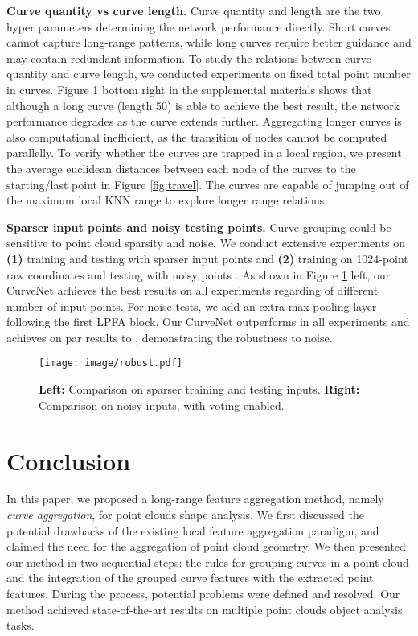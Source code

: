 \documentclass[10pt,twocolumn,letterpaper]{article}
\theoremstyle{definition}
\begin{document}
\noindent
\textbf{Curve quantity vs curve length.} Curve quantity  and length  are the two hyper parameters determining the network performance directly. Short curves cannot capture long-range patterns, while long curves require better guidance and may contain redundant information. To study the relations between curve quantity and curve length, we conducted experiments on fixed total point number in curves. Figure 1 bottom right in the supplemental materials shows that although a long curve (length 50) is able to achieve the best result, the network performance degrades as the curve extends further. Aggregating longer curves is also computational inefficient, as the transition of nodes cannot be computed parallelly. To verify whether the curves are trapped in a local region, we present the average euclidean distances between each node of the curves to the starting/last point in Figure \ref{fig:travel}. The curves are capable of jumping out of the maximum local KNN range to explore longer range relations.

\noindent
\textbf{Sparser input points and noisy testing points.} Curve grouping could be sensitive to point cloud sparsity and noise. We conduct extensive experiments on \textbf{(1)} training and testing with sparser input points and \textbf{(2)} training on 1024-point raw coordinates and testing with noisy points \cite{yan2020pointasnl}. As shown in Figure \ref{fig:robust} left, our CurveNet achieves the best results on all experiments regarding of different number of input points. For noise tests, we add an extra max pooling layer following the first LPFA block. Our CurveNet outperforms \cite{shen2018mining, qi2017pointnet} in all experiments and achieves on par results to \cite{yan2020pointasnl}, demonstrating the robustness to noise.




\begin{figure}[t]
	\begin{center}
\texttt{[image: image/robust.pdf]}
	\end{center}
	\caption{\textbf{Left:} Comparison on sparser training and testing inputs. \textbf{Right:} Comparison on noisy inputs, with voting enabled.}
	\label{fig:robust}
\end{figure}


\section{Conclusion}
In this paper, we proposed a long-range feature aggregation method, namely \textit{curve aggregation}, for point clouds shape analysis. We first discussed the potential drawbacks of the existing local feature aggregation paradigm, and claimed the need for the aggregation of point cloud geometry. We then presented our method in two sequential steps: the rules for grouping curves in a point cloud and the integration of the grouped curve features with the extracted point features. During the process, potential problems were defined and resolved. Our method achieved state-of-the-art results on multiple point clouds object analysis tasks.

{\small


}
\end{document}
